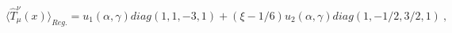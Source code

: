 \begin{equation}
\langle\hat{T}_\mu^\nu(x)\rangle_{Reg.}=u_1(\alpha,\gamma)diag(1,1,-3,1)
+\left(\xi-1/6\right)u_2(\alpha,\gamma)diag(1,-1/2,3/2,1) \ ,
\label{50}
\end{equation}

